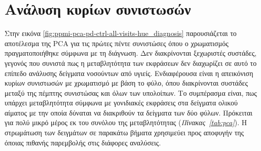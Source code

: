 \documentclass[12pt]{report}
\begin{document}
        \section{Ανάλυση κυρίων συνιστωσών}
            \par
                Στην εικόνα \ref{fig:ppmi-pca-pd-ctrl-all-visits-hue_diagnosis} παρουσιάζεται το αποτέλεσμα της PCA για τις πρώτες πέντε συνιστώσες όπου ο χρωματισμός πραγματοποιήθηκε σύμφωνα με τη διάγνωση. Δεν διακρίνονται ξεχωριστές συστάδες, γεγονός που συνιστά πως η μεταβλητότητα των εκφράσεων δεν διαχωρίζει σε αυτό το επίπεδο ανάλυσης δείγματα νοσούντων από υγιείς. Ενδιαφέρουσα είναι η απεικόνιση κυρίων συνιστωσών με χρωματισμό με βάση το φύλο, όπου διακρίνονται συστάδες μεταξύ της πέμπτης συνιστώσας και όλων των υπολοίπων. Το συμπέρασμα είναι, πως υπάρχει μεταβλητότητα σύμφωνα με γονιδιακές εκφράσεις στα δείγματα ολικού αίματος με την οποία δύναται να διακριθούν τα δείγματα των δύο φύλων. Πρόκειται για πολύ μικρό μέρος εκ του συνόλου της μεταβλητότητας (\emph{Πίνακας~\ref{tab:pca}}). Η στρωμάτωση των δειγμάτων σε παρακάτω βήματα χρησιμεύει προς αποφυγήν της όποιας πιθανής παρεμβολής στις διάφορες αναλύσεις.
\end{document}

